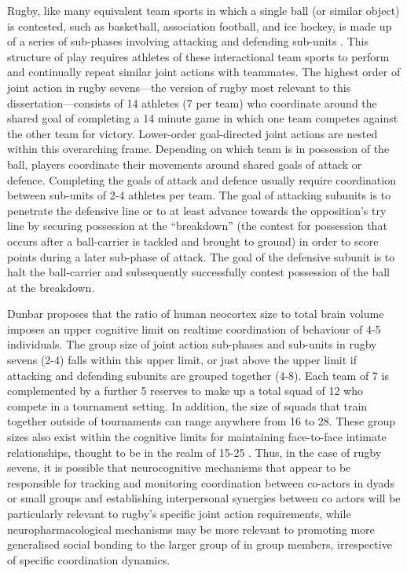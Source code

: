 Rugby, like many equivalent team sports in which a single ball (or similar object) is contested, such as basketball, association football, and ice hockey, is made up of a series of sub-phases involving attacking and defending sub-units \citep{Passos2011}. This structure of play requires athletes of these interactional team sports to perform and continually repeat similar joint actions with teammates.   The highest order of joint action in rugby sevens---the version of rugby most relevant to this dissertation---consists of 14 athletes (7 per team) who coordinate around the shared goal of completing a 14 minute game in which one team competes against the other team for victory. Lower-order goal-directed joint actions are nested within this overarching frame.  Depending on which team is in possession of the ball, players coordinate their movements around shared goals of attack or defence.  Completing the goals of attack and defence usually require coordination between sub-units of 2-4 athletes per team.  The goal of attacking subunits is to penetrate the defensive line or to at least advance towards the opposition's try line by securing possession at the ``breakdown'' (the contest for possession that occurs after a ball-carrier is tackled and brought to ground) in order to score points during a later sub-phase of attack.  The goal of the defensive subunit is to halt the ball-carrier and subsequently successfully contest possession of the ball at the breakdown.

Dunbar \textcite{Dunbar1992} proposes that the ratio of human neocortex size to total brain volume imposes an upper cognitive limit on realtime coordination of behaviour of 4-5 individuals.  The group size of joint action sub-phases and sub-units in rugby sevens (2-4) falls within this upper limit, or just above the upper limit if attacking and defending subunits are grouped together (4-8). Each team of 7 is complemented by a further 5 reserves to make up a total squad of 12 who compete in a tournament setting.  In addition, the size of squads that train together outside of tournaments can range anywhere from 16 to 28.  These group sizes also exist within the cognitive limits for maintaining face-to-face intimate relationships, thought to be in the realm of 15-25 \citep{Dunbar1992,Dunbar2010}. Thus, in the case of rugby sevens, it is possible that neurocognitive mechanisms that appear to be responsible for tracking and monitoring coordination between co-actors in dyads or small groups and establishing interpersonal synergies between co actors will be particularly relevant
to rugby's specific joint action requirements, while neuropharmacological mechanisms may be more relevant to promoting more generalised social bonding to the larger group of in group members, irrespective of specific coordination dynamics.

